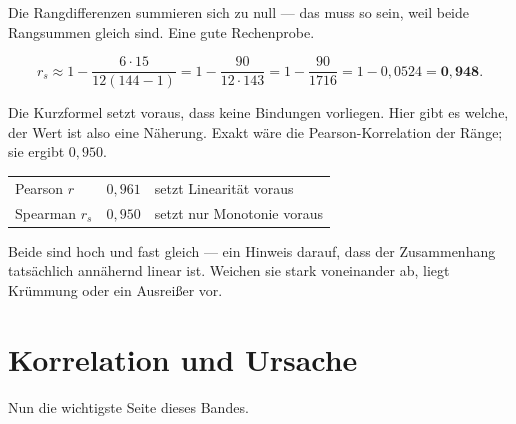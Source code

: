 \begin{merksatz}
Die Rangdifferenzen summieren sich zu null --- das muss so sein, weil beide Rangsummen gleich sind. Eine gute Rechenprobe.

\[ r_s \approx 1 - \frac{6 \cdot 15}{12(144-1)} = 1 - \frac{90}{12 \cdot 143} = 1 - \frac{90}{1716} = 1 - 0{,}0524 = \mathbf{0{,}948} . \]

Die Kurzformel setzt voraus, dass keine Bindungen vorliegen. Hier gibt es welche, der Wert ist also eine Näherung. Exakt wäre die Pearson-Korrelation der Ränge; sie ergibt $0{,}950$.

\begin{center}
\begin{minipage}{0.88\textwidth}
\end{minipage}
\end{center}

\begin{center}
\renewcommand{\arraystretch}{1.45}
\begin{tabular}{@{}P{3.0cm}P{2.0cm}P{2.8cm}@{}}
\toprule
Pearson $r$ & $0{,}961$ & setzt Linearität voraus\\
Spearman $r_s$ & $0{,}950$ & setzt nur Monotonie voraus\\
\bottomrule
\end{tabular}
\end{center}

Beide sind hoch und fast gleich --- ein Hinweis darauf, dass der Zusammenhang tatsächlich annähernd linear ist. Weichen sie stark voneinander ab, liegt Krümmung oder ein Ausreißer vor.
\end{merksatz}

\section{Korrelation und Ursache}

Nun die wichtigste Seite dieses Bandes.

